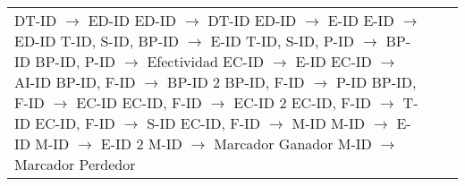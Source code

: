 \documentclass{report}
\begin{document}
\begin{tabularx}{\textwidth}{|X|X|X|}
        DT-ID $\rightarrow$ ED-ID \newline 
        ED-ID $\rightarrow$ DT-ID \newline 
        ED-ID $\rightarrow$ E-ID \newline 
        E-ID $\rightarrow$ ED-ID \newline 
        T-ID, S-ID, BP-ID $\rightarrow$ E-ID \newline 
        T-ID, S-ID, P-ID $\rightarrow$ BP-ID \newline 
        BP-ID, P-ID $\rightarrow$ Efectividad \newline 
        EC-ID $\rightarrow$ E-ID \newline 
        EC-ID $\rightarrow$ AI-ID \newline 
        BP-ID, F-ID $\rightarrow$ BP-ID 2 \newline 
        BP-ID, F-ID $\rightarrow$ P-ID \newline 
        BP-ID, F-ID $\rightarrow$ EC-ID \newline 
        EC-ID, F-ID $\rightarrow$ EC-ID 2 \newline 
        EC-ID, F-ID $\rightarrow$ T-ID \newline 
        EC-ID, F-ID $\rightarrow$ S-ID \newline 
        EC-ID, F-ID $\rightarrow$ M-ID \newline 
        M-ID $\rightarrow$ E-ID \newline 
        M-ID $\rightarrow$ E-ID 2 \newline 
        M-ID $\rightarrow$ Marcador Ganador \newline 
        M-ID $\rightarrow$ Marcador Perdedor & 


\end{tabularx}
\end{document}
